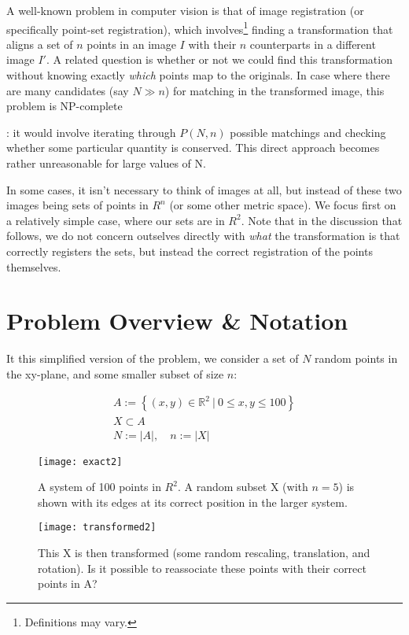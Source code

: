\documentclass[10pt,twocolumn]{article}
\providecommand{\R}{\mathbb{R}}%
\begin{document}
A well-known problem in computer vision is that of image registration (or
specifically point-set registration), which involves\footnote{Definitions may
vary.} finding a transformation that aligns a set of $n$ points in an
image $I$ with their $n$ counterparts in a different image $I'$. A related
question is whether or not we could find this transformation without knowing
exactly \emph{which} points map to the originals. In case where there are many
candidates (say $N \gg n$) for matching in the transformed image, this problem
is NP-complete{\cite{c01}: it would involve iterating through $P(N,n)$ possible
matchings and checking whether some particular quantity is conserved. This
direct approach becomes rather unreasonable for large values of N.

In some cases, it isn't necessary to think of images at all, but instead of
these two images being sets of points in $R^n$ (or some other metric space). We
focus first on a relatively simple case, where our sets are in $R^2$. Note that
in the discussion that follows, we do not concern outselves directly with
\emph{what} the transformation is that correctly registers the sets, but
instead the correct registration of the points themselves.

\section{Problem Overview \& Notation}

It this simplified version of the problem, we consider a set of $N$ random
points in the xy-plane, and some smaller subset of size $n$:

\begin{subequations}
  \begin{align}
    A := \left\{ (x,y) \in \R^2 \ | \  0 \leq x,y \leq 100 \right\} \\
    X \subset A \\
  N := |A|, \quad n := |X|
  \end{align}
\end{subequations}

\begin{figure*}
  \centering
  \begin{subfigure}[t]{0.48\textwidth}
    \centering
    \texttt{[image: exact2]}
    \caption{A system of 100 points in $R^2$. A random subset X (with $n=5$) is shown with
    its edges at its correct position in the larger system.}
  \end{subfigure} \hfill
  \begin{subfigure}[t]{0.48\textwidth}
    \centering
    \texttt{[image: transformed2]}
    \caption{This X is then transformed (some random rescaling, translation, and rotation).
    Is it possible to reassociate these points with their correct points in A?}
  \end{subfigure}
\end{figure*}

}
\end{document}

